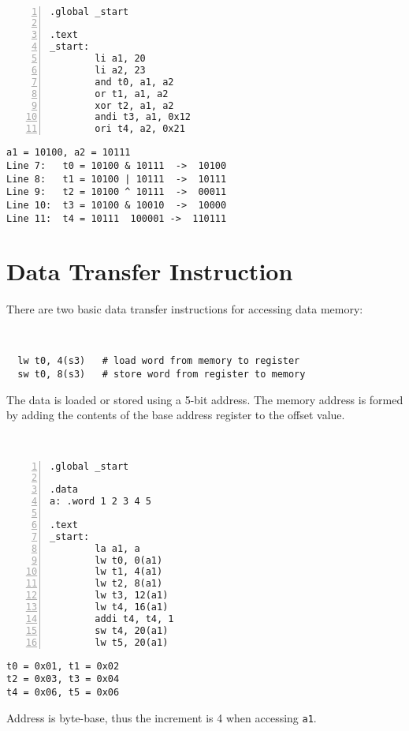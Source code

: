 \newpage
\begin{eg}~

\begin{minipage}{0.5\textwidth}
\begin{Verbatim}[numbers=left,xleftmargin=5mm]
.global _start

.text
_start:
        li a1, 20
        li a2, 23
        and t0, a1, a2
        or t1, a1, a2
        xor t2, a1, a2
        andi t3, a1, 0x12
        ori t4, a2, 0x21
\end{Verbatim}
\end{minipage}
\begin{minipage}{0.5\textwidth}
\color{red}
\begin{verbatim}
a1 = 10100, a2 = 10111
Line 7:   t0 = 10100 & 10111  ->  10100
Line 8:   t1 = 10100 | 10111  ->  10111
Line 9:   t2 = 10100 ^ 10111  ->  00011
Line 10:  t3 = 10100 & 10010  ->  10000
Line 11:  t4 = 10111  100001 ->  110111
\end{verbatim}
\end{minipage}
\end{eg}

\section{Data Transfer Instruction}
There are two basic data transfer instructions for accessing data memory:
\begin{codeBlock}~
\begin{verbatim}
  lw t0, 4(s3)   # load word from memory to register
  sw t0, 8(s3)   # store word from register to memory
\end{verbatim}
\end{codeBlock}

The data is loaded or stored using a 5-bit address. The memory address is formed by adding the contents of the base address register to the offset value.

\begin{eg}~

\begin{minipage}{0.5\textwidth}
\begin{Verbatim}[numbers=left,xleftmargin=5mm]
.global _start

.data
a: .word 1 2 3 4 5

.text
_start:
        la a1, a 
        lw t0, 0(a1) 
        lw t1, 4(a1) 
        lw t2, 8(a1) 
        lw t3, 12(a1) 
        lw t4, 16(a1) 
        addi t4, t4, 1
        sw t4, 20(a1)
        lw t5, 20(a1)
\end{Verbatim}
\end{minipage}
\begin{minipage}{0.5\textwidth}
\color{red}
\begin{verbatim}
t0 = 0x01, t1 = 0x02
t2 = 0x03, t3 = 0x04
t4 = 0x06, t5 = 0x06
\end{verbatim}
\end{minipage}
\begin{remark}
  Address is byte-base, thus the increment is 4 when accessing \verb|a1|. 
\end{remark}
\end{eg}

